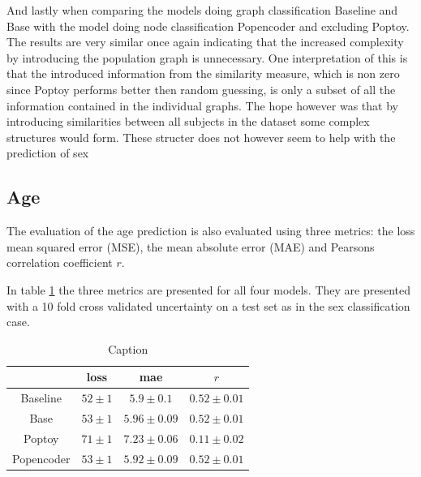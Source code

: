 And lastly when comparing the models doing graph classification Baseline and Base with the model doing node classification Popencoder and excluding Poptoy. The results are very similar once again indicating that the increased complexity by introducing the population graph is unnecessary. One interpretation of this is that the introduced information from the similarity measure, which is non zero since Poptoy performs better then random guessing, is only a subset of all the information contained in the individual graphs. The hope however was that by introducing  similarities between all subjects in the dataset some complex structures would form. These structer does not however seem to help with the prediction of sex


\subsection{Age}
The evaluation of the age prediction is also evaluated using three metrics: the loss mean squared error (MSE), the mean absolute error (MAE) and Pearsons correlation coefficient $r$. 

In table \ref{tab:age_model_results} the three metrics are presented for all four models. They are presented with a 10 fold cross validated uncertainty on a test set as in the sex classification case. 


\begin{table}[H]
    \centering
    \begin{tabular}{c|c|c|c}
         &  loss & mae & $r$ \\ \hline 
        Baseline &$52\pm1$& $5.9\pm0.1$&$0.52\pm0.01$\\
        Base & $53\pm1$& $5.96\pm 0.09 $& $0.52\pm0.01$\\
        Poptoy &$71\pm 1$ & $7.23\pm0.06$ &$ 0.11\pm 0.02$\\
        Popencoder &$53\pm1$& $5.92\pm 0.09$ & $0.52\pm0.01$\\
    \end{tabular}
    \caption{Caption}
    \label{tab:age_model_results}
\end{table}

